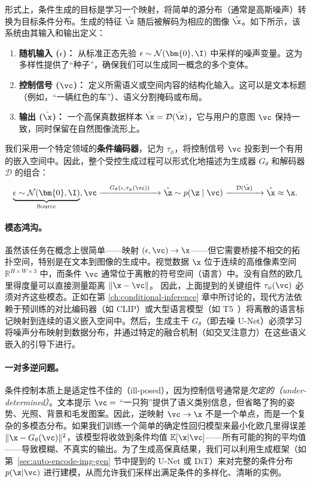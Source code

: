\documentclass[../../book-main_zh.tex]{subfiles}
\begin{document}
形式上，条件生成的目标是学习一个映射，将简单的源分布（通常是高斯噪声）转换为目标条件分布。生成的特征 $\hat{\z}$ 随后被解码为相应的图像 $\hat{\x}$。如下所示，该系统由其输入和输出定义：
\begin{enumerate}
    \item \textbf{随机输入 ($\epsilon$)：} 从标准正态先验 $\epsilon \sim \mathcal{N}(\bm{0}, \I)$ 中采样的噪声变量。这为多样性提供了“种子”，确保我们可以生成同一概念的多个变体。
    \item \textbf{控制信号 ($\vc$)：} 定义所需语义或空间内容的结构化输入。这可以是文本标题（例如，“一辆红色的车”）、语义分割掩码或布局。
    \item \textbf{输出 ($\hat{\x}$)：} 一个高保真数据样本 $\hat{\x} = \mathcal{D}(\hat{\z})$，它与用户的意图 $\vc$ 保持一致，同时保留在自然图像流形上。
\end{enumerate}
我们采用一个特定领域的\textbf{条件编码器}，记为 $\tau_\phi$，将控制信号 $\vc$ 投影到一个有用的嵌入空间中。因此，整个受控生成过程可以形式化地描述为生成器 $G_\theta$ 和解码器 $\mathcal{D}$ 的组合：
\begin{equation}
    \underbrace{\epsilon \sim \mathcal{N}(\bm{0}, \I)}_{\text{Source}}, \vc 
    \xrightarrow{\quad G_\theta(\epsilon, \tau_\phi(\vc)) \quad} 
    \hat{\z} \sim p(\z\mid \vc) 
    \xrightarrow{\quad \mathcal{D}(\hat{\z}) \quad} 
    \hat{\x} \approx \x.
\end{equation}

\paragraph{模态鸿沟。}
虽然该任务在概念上很简单——映射 $(\epsilon, \vc) \to \x$——但它需要桥接不相交的拓扑空间，特别是在文本到图像的生成中。视觉数据 $\x$ 位于连续的高维像素空间 $\mathbb{R}^{H \times W \times 3}$ 中，而条件 $\vc$ 通常位于离散的符号空间（语言）中。没有自然的欧几里得度量可以直接测量距离 $\| \x - \vc \|$。
因此，上面提到的关键组件 $\tau_\phi(\vc)$ 必须对齐这些模态。正如在第 \ref{ch:conditional-inference} 章中所讨论的，现代方法依赖于预训练的对比编码器（如 CLIP）或大型语言模型（如 T5~\citep{raffel2020exploring}）将离散的语言标记映射到连续的语义嵌入空间中。然后，生成主干 $G_\theta$（即去噪 U-Net）必须学习将噪声分布映射到数据分布，并通过特定的融合机制（如交叉注意力）在这些语义嵌入的引导下进行。

\paragraph{一对多逆问题。}
条件控制本质上是适定性不佳的（ill-posed），因为控制信号通常是\textit{欠定的（under-determined）}。文本提示 $\vc=$ “一只狗”提供了语义类别信息，但省略了狗的姿势、光照、背景和毛发图案。因此，逆映射 $\vc \to \x$ 不是一个单点，而是一个复杂的多模态分布。如果我们训练一个简单的确定性回归模型来最小化欧几里得误差 $\|\x - G_\theta(\vc)\|^2$，该模型将收敛到条件均值 $\mathbb{E}[\x|\vc]$——所有可能的狗的平均值——导致模糊、不真实的输出。为了生成高保真结果，我们可以利用生成框架（如第~\ref{sec:auto-encode-img-gen} 节中提到的 U-Net 或 DiT）来对完整的条件分布 $p(\z|\vc)$ 进行建模，从而允许我们采样出满足条件的多样化、清晰的实例。
\end{document}
